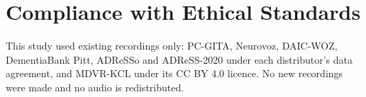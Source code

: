 \documentclass{article}
\begin{document}
\section{Compliance with Ethical Standards}
This study used existing recordings only: PC-GITA, Neurovoz, DAIC-WOZ, DementiaBank Pitt, ADReSSo and
ADReSS-2020 under each distributor's data agreement, and MDVR-KCL under its CC BY 4.0 licence. No new
recordings were made and no audio is redistributed.




\end{document}
